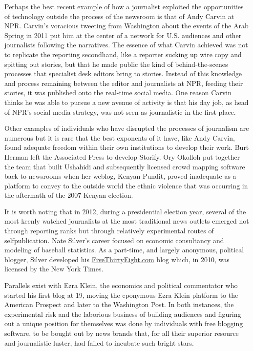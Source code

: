 Perhaps the best recent example of how a journalist exploited the opportunities
of technology outside the process of the newsroom is that of Andy Carvin at
NPR. Carvin’s voracious tweeting from Washington about the events of the Arab
Spring in 2011 put him at the center of a network for U.S. audiences and other
journalists following the narratives. The essence of what Carvin achieved was
not to replicate the reporting secondhand, like a reporter sucking up wire copy
and spitting out stories, but that he made public the kind of behind-the-scenes processes that specialist desk editors bring to stories. Instead of this knowledge
and process remaining between the editor and journalists at NPR, feeding their
stories, it was published onto the real-time social media. One reason Carvin
thinks he was able to pursue a new avenue of activity is that his day job, as head
of NPR’s social media strategy, was not seen as journalistic in the first place.

Other examples of individuals who have disrupted the processes of journalism are
numerous but it is rare that the best exponents of it have, like Andy Carvin, found
adequate freedom within their own institutions to develop their work. Burt Herman
left the Associated Press to develop Storify. Ory Okolloh put together the
team that built Ushahidi and subsequently licensed crowd mapping software
back to newsrooms when her weblog, Kenyan Pundit, proved inadequate as a
platform to convey to the outside world the ethnic violence that was occurring
in the aftermath of the 2007 Kenyan election.

It is worth noting that in 2012, during a presidential election year, several of the
most keenly watched journalists at the most traditional news outlets emerged
not through reporting ranks but through relatively experimental routes of selfpublication.
Nate Silver’s career focused on economic consultancy and modeling
of baseball statistics. As a part-time, and largely anonymous, political blogger,
Silver developed his \href{http://fivethirtyeight.com/}{FiveThirtyEight.com} blog which, in 2010, was licensed by
the New York Times.

Parallels exist with Ezra Klein, the economics and political commentator who
started his first blog at 19, moving the eponymous Ezra Klein platform to the
American Prospect and later to the Washington Post. In both instances, the
experimental risk and the laborious business of building audiences and figuring
out a unique position for themselves was done by individuals with free blogging
software, to be bought out by news brands that, for all their superior resource and
journalistic luster, had failed to incubate such bright stars.

